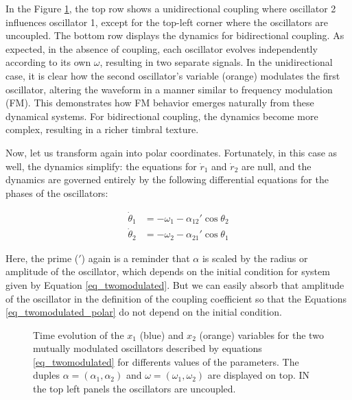 \documentclass{article}
\begin{document}
In the Figure \ref{fig_twomodulated}, the top row shows a unidirectional coupling where oscillator 2 influences oscillator 1, except for the top-left corner where the oscillators are uncoupled. 
The bottom row displays the dynamics for bidirectional coupling. 
As expected, in the absence of coupling, each oscillator evolves independently according to its own $\omega$, resulting in two separate signals. 
In the unidirectional case, it is clear how the second oscillator's variable (orange) modulates the first oscillator, altering the waveform in a manner similar to frequency modulation (FM). 
This demonstrates how FM behavior emerges naturally from these dynamical systems. 
For bidirectional coupling, the dynamics become more complex, resulting in a richer timbral texture.

Now, let us transform again into polar coordinates. 
Fortunately, in this case as well, the dynamics simplify: the equations for $\dot{r}_1$ and $\dot{r}_2$ are null, and the dynamics are governed entirely by the following differential equations for the phases of the oscillators:

\begin{subequations}  \label{eq_twomodulated_polar}
\begin{align}
    \dot{\theta}_1 & = -\omega_1  - \alpha_{12}' \cos{\theta}_2 \\
    \dot{\theta}_2 & = -\omega_2  - \alpha_{21}' \cos{\theta}_1
\end{align}
\end{subequations}

Here, the prime ($'$) again is a reminder that $\alpha$ is scaled by the radius or amplitude of the oscillator, which depends on the initial condition for system given by Equation \ref{eq_twomodulated}. 
But we can easily absorb that amplitude of the oscillator in the definition of the coupling coefficient so that the Equations \ref{eq_twomodulated_polar} do not depend on the initial condition.



\begin{figure} [h]
    \centerline{}
    \caption{Time evolution of the $x_1$ (blue) and $x_2$  (orange) variables for the two mutually modulated oscillators described by equations \ref{eq_twomodulated} for differents values of the parameters. The duples $\alpha=(\alpha_1,\alpha_2)$ and $\omega=(\omega_1,\omega_2)$ are 
    displayed on top. IN the top left panels the oscillators are uncoupled.}
    \label{fig_twomodulated}
\end{figure}
\end{document}
